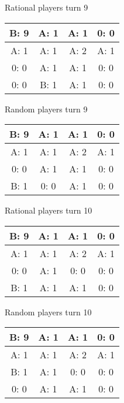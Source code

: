 \documentclass[12pt]{article}
\begin{document}
Rational players turn 9
\begin{center}
\begin{tabular}{|c|c|c|c|}
\hline
B: 9  & A: 1  & A: 1  & 0: 0  \\ \hline
A: 1  & A: 1  & A: 2  & A: 1  \\ \hline
0: 0  & A: 1  & A: 1  & 0: 0  \\ \hline
0: 0  & B: 1  & A: 1  & 0: 0  \\ \hline
\end{tabular}
\end{center}
Random players turn 9
\begin{center}
\begin{tabular}{|c|c|c|c|}
\hline
B: 9  & A: 1  & A: 1  & 0: 0  \\ \hline
A: 1  & A: 1  & A: 2  & A: 1  \\ \hline
0: 0  & A: 1  & A: 1  & 0: 0  \\ \hline
B: 1  & 0: 0  & A: 1  & 0: 0  \\ \hline
\end{tabular}
\end{center}

Rational players turn 10
\begin{center}
\begin{tabular}{|c|c|c|c|}
\hline
B: 9  & A: 1  & A: 1  & 0: 0  \\ \hline
A: 1  & A: 1  & A: 2  & A: 1  \\ \hline
0: 0  & A: 1  & 0: 0  & 0: 0  \\ \hline
B: 1  & A: 1  & A: 1  & 0: 0  \\ \hline
\end{tabular}
\end{center}
Random players turn 10
\begin{center}
\begin{tabular}{|c|c|c|c|}
\hline
B: 9  & A: 1  & A: 1  & 0: 0  \\ \hline
A: 1  & A: 1  & A: 2  & A: 1  \\ \hline
B: 1  & A: 1  & 0: 0  & 0: 0  \\ \hline
0: 0  & A: 1  & A: 1  & 0: 0  \\ \hline
\end{tabular}
\end{center}
\end{document}
